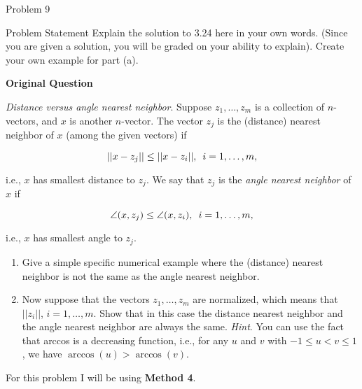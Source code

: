 \begin{problem}{Problem 9}
    \begin{statement}{Problem Statement}
        Explain the solution to 3.24 here in your own words. (Since you are given a solution, you will be graded on your ability to explain). Create your own example for part (a). \vspace*{1em}

        \textbf{Original Question} \vspace*{1em}

        \textit{Distance versus angle nearest neighbor}. Suppose $z_{1} , \dots , z_{m}$ is a collection of $n$-vectors, and $x$ is another $n$-vector. The vector $z_{j}$ is the (distance) nearest neighbor of
        $x$ (among the given vectors) if

        \begin{equation*}
            ||x-z_{j}|| \leq ||x - z_{i}||, \hspace*{5pt} i = 1 , \dots , m,
        \end{equation*}

        i.e., $x$ has smallest distance to $z_{j}$. We say that $z_{j}$ is the \textit{angle nearest neighbor} of $x$ if

        \begin{equation*}
            \angle (x,z_{j}) \leq \angle (x,z_{i}), \hspace*{5pt} i = 1 , \dots , m,
        \end{equation*}

        i.e., $x$ has smallest angle to $z_{j}$.

        \begin{enumerate}[label=(\alph*)]
            \item Give a simple specific numerical example where the (distance) nearest neighbor is not the same as the angle nearest neighbor.
            \item Now suppose that the vectors $z_{1} , \dots , z_{m}$ are normalized, which means that $||z_{i}||$, $i = 1 , \dots , m$. Show that in this case the distance nearest neighbor and the angle nearest 
            neighbor are always the same. \textit{Hint}. You can use the fact that arccos is a decreasing function, i.e., for any $u$ and $v$ with $-1 \leq u < v \leq 1$, we have $\arccos{(u)} > \arccos{(v)}$.
        \end{enumerate}
    \end{statement}

    \begin{Highlight}
        For this problem I will be using \textbf{Method 4}. \vspace*{1em}


\end{Highlight}
\end{problem}
